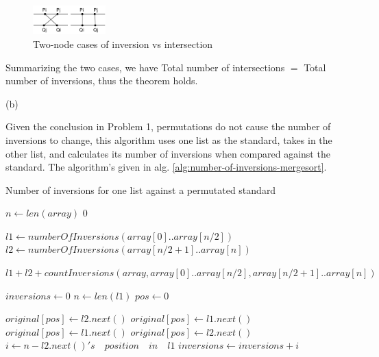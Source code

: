 \documentclass{article}
\begin{document}
\begin{description}
\begin{itemize}
  \end{itemize}

  \begin{figure}[h]
  \centering
  \includegraphics[width=0.25\textwidth]{pb2}
  \caption{Two-node cases of inversion vs intersection}
  \label{fig:pb2}
  \end{figure}

  Summarizing the two cases, we have Total number of intersections $ = $ Total number of inversions, thus the theorem holds. 

  (b)

  Given the conclusion in Problem 1, permutations do not cause the number of inversions to change, this algorithm uses one list as the standard, takes in the other list, and calculates its number of inversions when compared against the standard. The algorithm's given in alg. \ref{alg:number-of-inversions-mergesort}.
  
  \begin{algorithm}[h]
  \caption{Number of inversions for one list against a permutated standard}
  \label{alg:number-of-inversions-mergesort}
    \begin{algorithmic}[1]
      \State $n \gets len(array)$
        \State \Return $0$
      \EndIf
      
      \State $l1 \gets numberOfInversions(array[0]..array[n/2])$
      \State $l2 \gets numberOfInversions(array[n/2+1]..array[n])$

      \State \Return $l1 + l2 + countInversions(array, array[0]..array[n/2], array[n/2+1]..array[n])$
    \EndFunction

      \State $inversions \gets 0$
      \State $n \gets len(l1)$
      \State $pos \gets 0$

          \State $original[pos] \gets l2.next()$
          \State $original[pos] \gets l1.next()$
          \State $original[pos] \gets l1.next()$
        \Else
          \State $original[pos] \gets l2.next()$
          \State $i \gets n - l2.next()'s \quad position \quad in \quad l1$
          \State $inversions \gets inversions + i$
        \EndIf
        

\end{algorithmic}
\end{algorithm}
\end{description}
\end{document}
